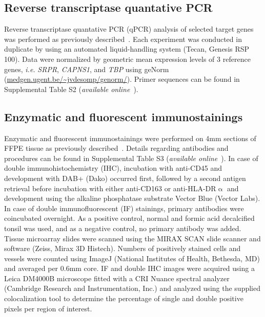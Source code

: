 \subsection{Reverse transcriptase quantative PCR}
Reverse transcriptase quantative PCR (qPCR) analysis
of selected target genes was performed as previously
described~\cite{rozeman2005absence}. Each experiment was conducted in duplicate
by using an automated liquid\hyp{}handling system (Tecan,
Genesis RSP 100). Data were normalized by geometric
mean expression levels of 3 reference genes, {\it i.e.} {\it SRPR},
{\it CAPNS1}, and {\it TBP} using geNorm (\url{medgen.ugent.be/~jvdesomp/genorm/}). Primer sequences can be found in
Supplemental Table S2 ({\it available online}~\cite{ch4additional}).

\subsection{Enzymatic and fluorescent immunostainings}
Enzymatic and fluorescent immunostainings were performed
on 4mm sections of FFPE tissue as previously
described~\cite{mohseny2009osteosarcoma}. Details regarding antibodies and procedures
can be found in Supplemental Table S3 ({\it available online}~\cite{ch4additional}). In case of
double immunohistochemistry (IHC), incubation with
anti\hyp{}CD45 and development with DAB+ (Dako) occurred
first, followed by a second antigen retrieval before incubation
with either anti\hyp{}CD163 or anti\hyp{}HLA-DR$\upalpha$ and development
using the alkaline phosphatase substrate Vector
Blue (Vector Labs). In case of double immunofluorescent
(IF) stainings, primary antibodies were coincubated overnight.
As a positive control, normal and formic acid decalcified
tonsil was used, and as a negative control, no
primary antibody was added. Tissue microarray slides were
scanned using the MIRAX SCAN slide scanner and software
(Zeiss, Mirax 3D Histech). Numbers of positively stained
cells and vessels were counted using ImageJ (National
Institutes of Health, Bethesda, MD) and averaged per
0.6mm core. IF and double IHC images were acquired
using a Leica DM4000B microscope fitted with a CRI
Nuance spectral analyzer (Cambridge Research and Instrumentation,
Inc.) and analyzed using the supplied colocalization
tool to determine the percentage of single and
double positive pixels per region of interest.

